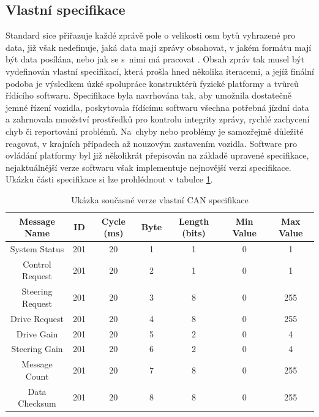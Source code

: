 \documentclass[czech, bachelor]{diploma}
\begin{document}
\subsection{Vlastní specifikace}
Standard sice přiřazuje každé zprávě pole o velikosti osm bytů vyhrazené pro data, již však nedefinuje, jaká data mají zprávy
obsahovat, v jakém formátu mají být data posílána, nebo jak se s~nimi má pracovat \cite{can-source}. Obsah zpráv tak musel být
vydefinován vlastní specifikací, která prošla hned několika iteracemi, a jejíž finální podoba je výsledkem úzké spolupráce
konstruktérů fyzické platformy a tvůrců řídícího softwaru. Specifikace byla navrhována tak, aby umožnila dostatečně jemné řízení
vozidla, poskytovala řídícímu softwaru všechna potřebná jízdní data a zahrnovala množství prostředků pro kontrolu integrity
zprávy, rychlé zachycení chyb či reportování problémů. Na~chyby nebo problémy je samozřejmě důležité reagovat, v krajních
případech až nouzovým zastavením vozidla. Software pro ovládání platformy byl již několikrát přepisován na základě upravené
specifikace, nejaktuálnější verze softwaru však implementuje nejnovější verzi specifikace. Ukázku části specifikace si lze
prohlédnout v tabulce \ref{tab:can-spec-table}.

\begin{table}
  \centering
  \caption{Ukázka současné verze vlastní CAN specifikace}
  \label{tab:can-spec-table}
  \begin{tabular}{ |c|c|c|c|c|c|c| }
    \hline
    Message Name     & ID  & Cycle (ms) & Byte & Length (bits) & Min Value & Max Value \\
    \hline
    System Status    & 201 & 20         & 1    & 1             & 0         & 1 \\
    \hline
    Control Request  & 201 & 20         & 2    & 1             & 0         & 1 \\
    \hline
    Steering Request & 201 & 20         & 3    & 8             & 0         & 255 \\
    \hline
    Drive Request    & 201 & 20         & 4    & 8             & 0         & 255 \\
    \hline
    Drive Gain       & 201 & 20         & 5    & 2             & 0         & 4 \\
    \hline
    Steering Gain    & 201 & 20         & 6    & 2             & 0         & 4 \\
    \hline
    Message Count    & 201 & 20         & 7    & 8             & 0         & 255 \\
    \hline
    Data Checksum    & 201 & 20         & 8    & 8             & 0         & 255 \\
    \hline
  \end{tabular}
\end{table}
\end{document}

